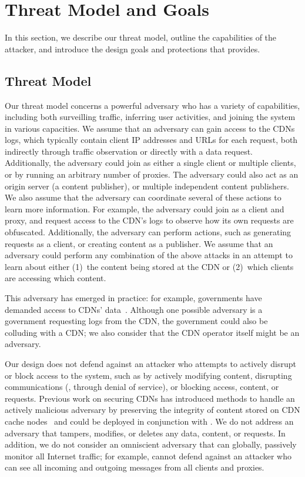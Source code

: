 \section{Threat Model and Goals}
\label{sec:threat}
In this section, we describe our threat model, outline the capabilities of the 
attacker, and introduce the design goals and protections that \system{} provides.

\subsection{Threat Model}
\label{sec:attacker}

Our threat model concerns a powerful adversary who has a variety of capabilities,
including both surveilling traffic, inferring user activities, and joining
the system in various capacities.
We assume that an adversary can gain
access to the CDNs logs, which typically contain client IP addresses and URLs for
each request, both indirectly through traffic observation or directly with a data
request. Additionally,
the adversary could join \system{} as either a single client or multiple clients,
or by running an arbitrary number of \system{} proxies.  The adversary could 
also act as an origin server (a content publisher), or multiple independent content
publishers. We also assume that the adversary
can coordinate several of these actions to learn more information.  For example, the 
adversary could join as a client and proxy, and request access to the CDN's
logs to observe how its own requests are obfuscated.  Additionally, 
the adversary can perform actions, such as generating requests as a client, or creating content 
as a publisher. We assume that an adversary could perform any combination
of the above attacks in an attempt to learn about either (1)~the content being stored
at the CDN or (2)~which clients are accessing which content.  

This adversary has emerged in practice:
for example, governments have demanded access to CDNs'
data~\cite{cloudflare_nsl}. Although one possible adversary is a government
requesting logs from the CDN, the government could also be colluding with a
CDN; we also consider that the CDN operator itself might be an adversary.

Our design does not defend against an attacker who attempts to actively
disrupt or block access to the system, such as by actively modifying content,
disrupting communications (\eg, through denial of service), or blocking
access, content, or requests. Previous work on securing CDNs has introduced
methods to handle an actively malicious adversary by preserving the integrity
of content  stored on CDN cache nodes~\cite{levy2015stickler} and could be
deployed in conjunction with \system{}. We do not address an adversary that
tampers, modifies, or deletes any data, content, or requests.  In addition, we
do not consider an omniscient adversary that can globally, passively monitor
all Internet traffic; for example, \system{} cannot defend against an attacker
who can see all incoming and outgoing messages from all clients and proxies.

